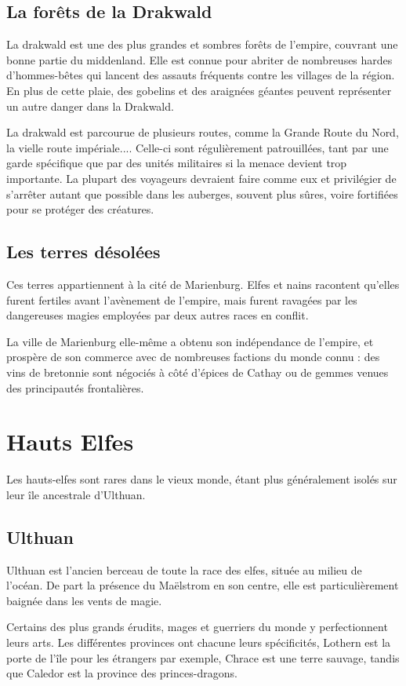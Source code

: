 \documentclass[10pt,a4paper]{book}
\begin{document}
\section{La forêts de la Drakwald}
La drakwald est une des plus grandes et sombres forêts de l'empire, couvrant une bonne partie du middenland. Elle est connue pour abriter de nombreuses hardes d'hommes-bêtes qui lancent des assauts fréquents contre les villages de la région. En plus de cette plaie, des gobelins et des araignées géantes peuvent représenter un autre danger dans la Drakwald.

La drakwald est parcourue de plusieurs routes, comme la Grande Route du Nord, la vielle route impériale.... Celle-ci sont régulièrement patrouillées, tant par une garde spécifique que par des unités militaires si la menace devient trop importante. La plupart des voyageurs devraient faire comme eux et privilégier de s'arrêter autant que possible dans les auberges, souvent plus sûres, voire fortifiées pour se protéger des créatures.
\section{Les terres désolées}
Ces terres appartiennent à la cité de Marienburg. Elfes et nains racontent qu'elles furent fertiles avant l'avènement de l'empire, mais furent ravagées par les dangereuses magies employées par deux autres races en conflit.

La ville de Marienburg elle-même a obtenu son indépendance de l'empire, et prospère de son commerce avec de nombreuses factions du monde connu : des vins de bretonnie sont négociés à côté d'épices de Cathay ou de gemmes venues des principautés frontalières. 
\chapter{Hauts Elfes}
Les hauts-elfes sont rares dans le vieux monde, étant plus généralement isolés sur leur île ancestrale d'Ulthuan.
\section{Ulthuan}
Ulthuan est l'ancien berceau de toute la race des elfes, située au milieu de l'océan. De part la présence du Maëlstrom en son centre, elle est particulièrement baignée dans les vents de magie.

Certains des plus grands érudits, mages et guerriers du monde y perfectionnent leurs arts. Les différentes provinces ont chacune leurs spécificités, Lothern est la porte de l'île pour les étrangers par exemple, Chrace est une terre sauvage, tandis que Caledor est la province des princes-dragons.
\end{document}
